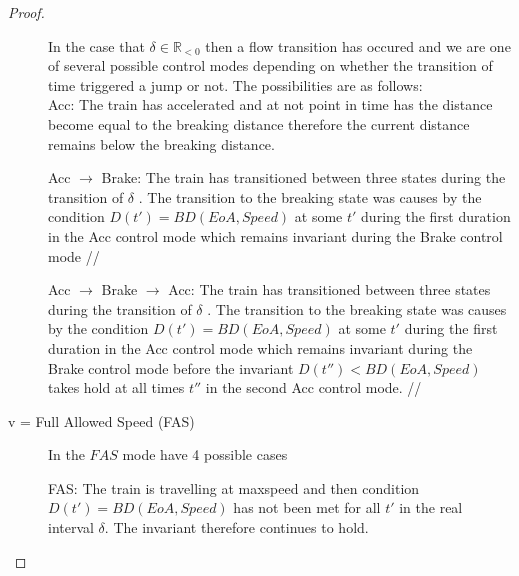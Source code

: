 \begin{mytheorem}
\begin{proof}
\begin{description}
In the case that $\delta \in \mathbb{R}_{< 0}$ then a flow transition has occured and we are one of several
possible control modes depending on whether the transition of time triggered a jump or not.  The possibilities are as follows: \\

Acc: The train has accelerated and at not point in time has the distance become equal to the breaking distance therefore the current distance remains below the breaking distance. 


Acc $\to$ Brake: The train has transitioned between three states during the transition of $\delta$  . The transition to the breaking state was causes by the condition $D(t') = BD(EoA,Speed)$ at some $t'$ during the first duration in the Acc control mode which remains invariant during the Brake control mode //

Acc $\to$ Brake $\to$ Acc: The train has transitioned between three states during the transition of $\delta$  . The transition to the breaking state was causes by the condition $D(t') = BD(EoA,Speed)$ at some $t'$ during the first duration in the Acc control mode which remains invariant during the Brake control mode before the invariant  $D(t'') < BD(EoA,Speed)$ takes hold at all times $t''$ in the second Acc control mode. //

\item[v = Full Allowed Speed (FAS)] In the $FAS$ mode have 4 possible cases 

FAS: The train is travelling at maxspeed and then condition $D(t') = BD(EoA,Speed)$ has not been met for all $t'$ in the real interval $\delta$. The invariant therefore continues to hold.


\end{description}
\end{proof}
\end{mytheorem}
